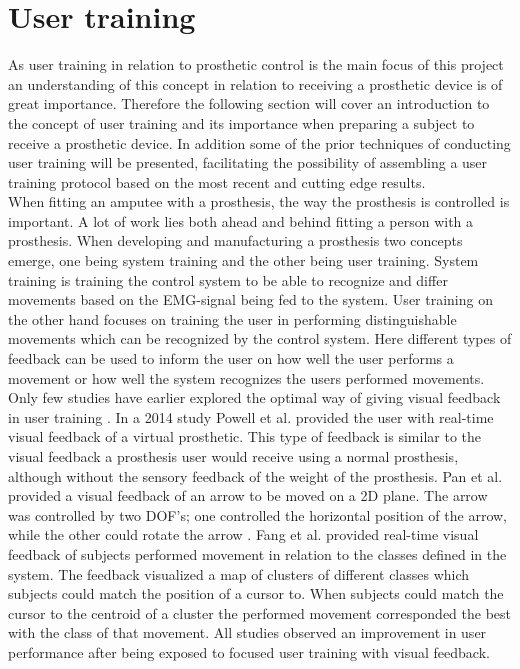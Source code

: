 
\section{User training} \label{sec:BG:userTraining}

As user training in relation to prosthetic control is the main focus of this project an understanding of this concept in relation to receiving a prosthetic device is of great importance. Therefore the following section will cover an introduction to the concept of user training and its importance when preparing a subject to receive a prosthetic device. In addition some of the prior techniques of conducting user training will be presented, facilitating the possibility of assembling a user training protocol based on the most recent and cutting edge results. \\
When fitting an amputee with a prosthesis, the way the prosthesis is controlled is important. A lot of work lies both ahead and behind fitting a person with a prosthesis. When developing and manufacturing a prosthesis two concepts emerge, one being system training and the other being user training. System training is training the control system to be able to recognize and differ movements based on the EMG-signal being fed to the system. \cite{Fougner2012} User training on the other hand focuses on training the user in performing distinguishable movements which can be recognized by the control system. Here different types of feedback can be used to inform the user on how well the user performs a movement or how well the system recognizes the users performed movements. \cite{Powell2014,Simon2013} \\
Only few studies have earlier explored the optimal way of giving visual feedback in user training \cite{Jiang2012}. In a 2014 study Powell et al. \cite{Powell2014} provided the user with real-time visual feedback of a virtual prosthetic. This type of feedback is similar to the visual feedback a prosthesis user would receive using a normal prosthesis, although without the sensory feedback of the weight of the prosthesis. Pan et al. \cite{Pan2017} provided a visual feedback of an arrow to be moved on a 2D plane. The arrow was controlled by two DOF's; one controlled the horizontal position of the arrow, while the other could rotate the arrow \cite{Pan2017}. Fang et al. \cite{Fang2017} provided real-time visual feedback of subjects performed movement in relation to the classes defined in the system. The feedback visualized a map of clusters of different classes which subjects could match the position of a cursor to. When subjects could match the cursor to the centroid of a cluster the performed movement corresponded the best with the class of that movement. \cite{Fang2017} All studies observed an improvement in user performance after being exposed to focused user training with visual feedback. \\
